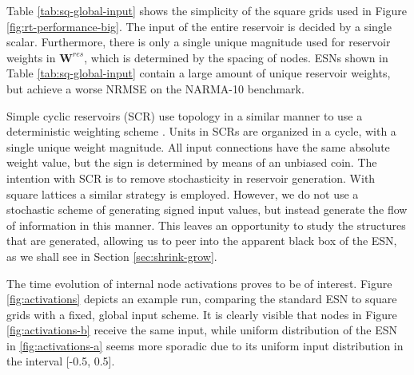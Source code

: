 Table \ref{tab:sq-global-input} shows the simplicity of the square grids used in
Figure \ref{fig:rt-performance-big}. The input of the entire reservoir is
decided by a single scalar. Furthermore, there is only a single unique magnitude
used for reservoir weights in $\mathbf{W}^{res}$, which is determined by the
spacing of nodes. ESNs shown in Table \ref{tab:sq-global-input} contain a large
amount of unique reservoir weights, but achieve a worse NRMSE on the NARMA-10
benchmark.

Simple cyclic reservoirs (SCR) use topology in a similar manner to use a
deterministic weighting scheme \cite{rodan_minimum_2011}. Units in SCRs are
organized in a cycle, with a single unique weight magnitude. All input
connections have the same absolute weight value, but the sign is determined by
means of an unbiased coin. The intention with SCR is to remove stochasticity in
reservoir generation. With square lattices a similar strategy is
employed. However, we do not use a stochastic scheme of generating signed input
values, but instead generate the flow of information in this manner. This leaves
an opportunity to study the structures that are generated, allowing us to peer
into the apparent black box of the ESN, as we shall see in Section
\ref{sec:shrink-grow}.

The time evolution of internal node activations proves to be of interest. Figure
\ref{fig:activations} depicts an example run, comparing the standard ESN to
square grids with a fixed, global input scheme. It is clearly visible that nodes
in Figure \ref{fig:activations-b} receive the same input, while uniform
distribution of the ESN in \ref{fig:activations-a} seems more sporadic due to
its uniform input distribution in the interval [-0.5, 0.5].


